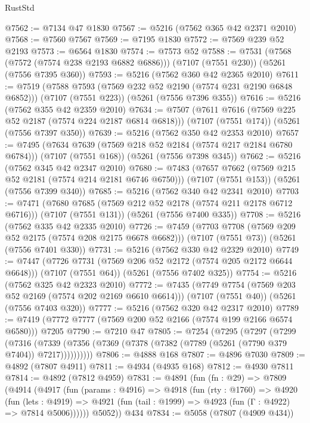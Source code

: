 \begin{lexlean}{RustStd}
\begin{coremodule}
@7562 := @7134 @47 @1830
@7567 := @5216 (@7562 @365 @42 @2371 @2010)
@7568 := @7560 @7567
@7569 := @7195 @1830
@7572 := @7569 @239 @52 @2193
@7573 := @6564 @1830
@7574 := @7573 @52
@7588 := @7531
    (@7568 (@7572 (@7574 @238 @2193 @6882 @6886)))
    (@7107 (@7551 @230))
    (@5261 (@7556 @7395 @360))
@7593 := @5216 (@7562 @360 @42 @2365 @2010)
@7611 := @7519
    (@7588 @7593 (@7569 @232 @52 @2190 (@7574 @231 @2190 @6848 @6852)))
    (@7107 (@7551 @223))
    (@5261 (@7556 @7396 @355))
@7616 := @5216 (@7562 @355 @42 @2359 @2010)
@7634 := @7507
    (@7611 @7616 (@7569 @225 @52 @2187 (@7574 @224 @2187 @6814 @6818)))
    (@7107 (@7551 @174))
    (@5261 (@7556 @7397 @350))
@7639 := @5216 (@7562 @350 @42 @2353 @2010)
@7657 := @7495
    (@7634 @7639 (@7569 @218 @52 @2184 (@7574 @217 @2184 @6780 @6784)))
    (@7107 (@7551 @168))
    (@5261 (@7556 @7398 @345))
@7662 := @5216 (@7562 @345 @42 @2347 @2010)
@7680 := @7483
    (@7657 @7662 (@7569 @215 @52 @2181 (@7574 @214 @2181 @6746 @6750)))
    (@7107 (@7551 @153))
    (@5261 (@7556 @7399 @340))
@7685 := @5216 (@7562 @340 @42 @2341 @2010)
@7703 := @7471
    (@7680 @7685 (@7569 @212 @52 @2178 (@7574 @211 @2178 @6712 @6716)))
    (@7107 (@7551 @131))
    (@5261 (@7556 @7400 @335))
@7708 := @5216 (@7562 @335 @42 @2335 @2010)
@7726 := @7459
    (@7703 @7708 (@7569 @209 @52 @2175 (@7574 @208 @2175 @6678 @6682)))
    (@7107 (@7551 @73))
    (@5261 (@7556 @7401 @330))
@7731 := @5216 (@7562 @330 @42 @2329 @2010)
@7749 := @7447
    (@7726 @7731 (@7569 @206 @52 @2172 (@7574 @205 @2172 @6644 @6648)))
    (@7107 (@7551 @64))
    (@5261 (@7556 @7402 @325))
@7754 := @5216 (@7562 @325 @42 @2323 @2010)
@7772 := @7435
    (@7749 @7754 (@7569 @203 @52 @2169 (@7574 @202 @2169 @6610 @6614)))
    (@7107 (@7551 @40))
    (@5261 (@7556 @7403 @320))
@7777 := @5216 (@7562 @320 @42 @2317 @2010)
@7789 := @7419 (@7772 @7777 (@7569 @200 @52 @2166 (@7574 @199 @2166 @6574 @6580))) @7205
@7790 := @7210 @47
@7805 := @7254
    (@7295
      (@7297
        (@7299
          (@7316
            (@7339 (@7356 (@7369 (@7378 (@7382 (@7789 (@5261 (@7790 @379 @7404)) @7217))))))))))
@7806 := @4888 @168
@7807 := @4896 @7030
@7809 := @4892 (@7807 @4911)
@7811 := @4934 (@4935 @168)
@7812 := @4930 @7811
@7814 := @4892 (@7812 @4959)
@7831 := @4891
    (fun (fn : @29) =>
    @7809
      (@4914
        (@4917
          (fun (params : @4916) =>
          @4918
            (fun (rty : @1760) =>
            @4920
              (fun (lets : @4919) =>
              @4921 (fun (tail : @1999) => @4923 (fun (Γ : @4922) => @7814 @5006))))))
        @5052))
    @434
@7834 := @5058 (@7807 (@4909 @434))

\end{coremodule}
\end{lexlean}
